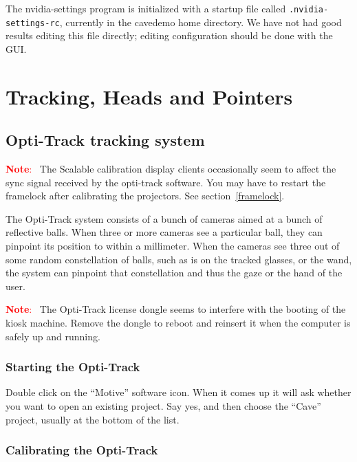 \documentclass[11pt]{article}
\newenvironment{note}[1][Note]{\begin{lrbox}{\notebox}%
    \begin{minipage}{0.9\columnwidth}\textcolor{red}{\textbf{#1}:~}}%
    {\end{minipage}\end{lrbox}\begin{center}\setlength{\fboxsep}{8pt}%
    \fbox{\usebox{\notebox}}\end{center}}
\newcommand{\cmd}[1]{\texttt{#1}\xspace}
\newcommand{\menu}[1]{``#1''\xspace}
\begin{document}
The nvidia-settings program is initialized with a startup file called
\cmd{.nvidia-settings-rc}, currently in the cavedemo home
directory.  We have not had good results editing this file directly;
editing configuration should be done with the GUI.


\section{Tracking, Heads and Pointers}

\subsection{Opti-Track tracking system}
\label{opti-track}

\begin{note}
  The Scalable calibration display clients occasionally seem to affect
  the sync signal received by the opti-track software.  You may have
  to restart the framelock after calibrating the projectors.  See
  section~\ref{framelock}.
\end{note}

The Opti-Track system consists of a bunch of cameras aimed at a bunch
of reflective balls.  When three or more cameras see a particular
ball, they can pinpoint its position to within a millimeter.  When the
cameras see three out of some random constellation of balls, such as
is on the tracked glasses, or the wand, the system can pinpoint that
constellation and thus the gaze or the hand of the user.


\begin{note}
  The Opti-Track license dongle seems to interfere with the booting of
  the kiosk machine.  Remove the dongle to reboot and reinsert it when
  the computer is safely up and running.
\end{note}

\subsubsection{Starting the Opti-Track}

Double click on the ``Motive'' software icon.  When it comes up it
will ask whether you want to open an existing project.  Say yes, and
then choose the \menu{Cave} project, usually at the bottom of the list.

\subsubsection{Calibrating the Opti-Track}
\end{document}
